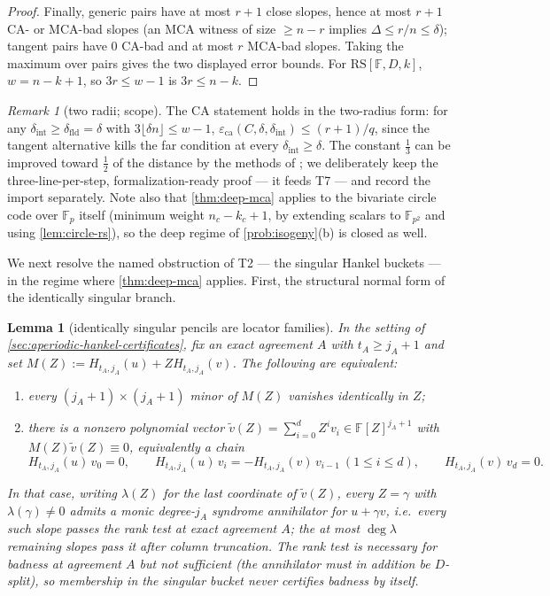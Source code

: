 \documentclass[11pt]{article}
\newtheorem{lemma}[theorem]{Lemma}
\theoremstyle{definition}
\theoremstyle{remark}
\newtheorem{remark}[theorem]{Remark}
\newcommand{\F}{\mathbb{F}}
\newcommand{\RS}{\mathrm{RS}}
\newcommand{\eca}{\varepsilon_{\mathrm{ca}}}
\newcommand{\dist}{\Delta}
\begin{document}
\begin{proof}
Finally, generic pairs have at most $r+1$ close slopes, hence at most $r+1$ CA- or MCA-bad slopes (an MCA witness of size $\ge n-r$ implies $\dist\le r/n\le\delta$); tangent pairs have $0$ CA-bad and at most $r$ MCA-bad slopes. Taking the maximum over pairs gives the two displayed error bounds. For $\RS[\F,D,k]$, $w=n-k+1$, so $3r\le w-1$ is $3r\le n-k$.
\end{proof}

\begin{remark}[two radii; scope]
The CA statement holds in the two-radius form: for any $\delta_{\mathrm{int}}\ge\delta_{\mathrm{fld}}=\delta$ with $3\lfloor\delta n\rfloor\le w-1$, $\eca(C,\delta,\delta_{\mathrm{int}})\le(r+1)/q$, since the tangent alternative kills the far condition at every $\delta_{\mathrm{int}}\ge\delta$. The constant $\frac13$ can be improved toward $\frac12$ of the distance by the methods of \cite{BCHKS25}; we deliberately keep the three-line-per-step, formalization-ready proof --- it feeds T7 --- and record the import separately. Note also that \cref{thm:deep-mca} applies to the bivariate circle code over $\F_p$ itself \textup(minimum weight $n_c-k_c+1$, by extending scalars to $\F_{p^2}$ and using \cref{lem:circle-rs}\textup), so the deep regime of \cref{prob:isogeny}\textup{(b)} is closed as well.
\end{remark}

We next resolve the named obstruction of T2 --- the singular Hankel buckets --- in the regime where \cref{thm:deep-mca} applies. First, the structural normal form of the identically singular branch.

\begin{lemma}[identically singular pencils are locator families]\label{lem:singular-pencil}
In the setting of \cref{sec:aperiodic-hankel-certificates}, fix an exact agreement $A$ with $t_A\ge j_A+1$ and set $M(Z):=H_{t_A,j_A}(u)+ZH_{t_A,j_A}(v)$. The following are equivalent:
\begin{enumerate}[label=\textup{(\roman*)}]
\item every $(j_A+1)\times(j_A+1)$ minor of $M(Z)$ vanishes identically in $Z$;
\item there is a nonzero polynomial vector $\widetilde v(Z)=\sum_{i=0}^{d}Z^iv_i\in\F[Z]^{j_A+1}$ with $M(Z)\widetilde v(Z)\equiv0$, equivalently a chain
\[
H_{t_A,j_A}(u)\,v_0=0,\qquad
H_{t_A,j_A}(u)\,v_{i}=-H_{t_A,j_A}(v)\,v_{i-1}\ (1\le i\le d),\qquad
H_{t_A,j_A}(v)\,v_d=0 .
\]
\end{enumerate}
In that case, writing $\lambda(Z)$ for the last coordinate of $\widetilde v(Z)$, every $Z=\gamma$ with $\lambda(\gamma)\ne0$ admits a monic degree-$j_A$ syndrome annihilator for $u+\gamma v$, i.e.\ every such slope passes the rank test at exact agreement $A$; the at most $\deg\lambda$ remaining slopes pass it after column truncation. The rank test is necessary for badness at agreement $A$ but not sufficient \textup(the annihilator must in addition be $D$-split\textup), so membership in the singular bucket never certifies badness by itself.
\end{lemma}
\end{document}
